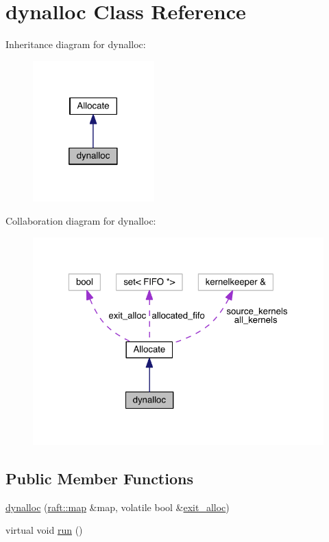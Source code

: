 \hypertarget{classdynalloc}{}\section{dynalloc Class Reference}
\label{classdynalloc}


Inheritance diagram for dynalloc\+:
\nopagebreak
\begin{figure}[H]
\begin{center}
\leavevmode
\includegraphics[width=133pt]{classdynalloc__inherit__graph}
\end{center}
\end{figure}


Collaboration diagram for dynalloc\+:
\nopagebreak
\begin{figure}[H]
\begin{center}
\leavevmode
\includegraphics[width=323pt]{classdynalloc__coll__graph}
\end{center}
\end{figure}
\subsection*{Public Member Functions}
\begin{DoxyCompactItemize}
\item 
\hyperlink{classdynalloc_ad5aa0343bab70d1f51e05953d890e8d2}{dynalloc} (\hyperlink{classraft_1_1map}{raft\+::map} \&map, volatile bool \&\hyperlink{class_allocate_a4d10076b88ab1297c89b8a05e117b510}{exit\+\_\+alloc})
\item 
virtual void \hyperlink{classdynalloc_a2a52b86ec09bd6dd52e49062137b2e37}{run} ()
\end{DoxyCompactItemize}
